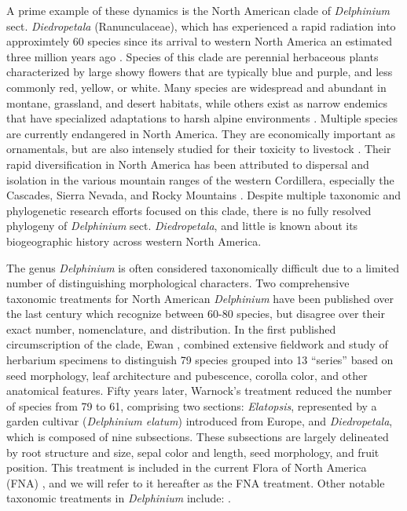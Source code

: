 \documentclass[11pt]{article}
\begin{document}
A prime example of these dynamics is the North American clade of \emph{Delphinium} 
sect. \emph{Diedropetala} (Ranunculaceae), which has experienced a rapid radiation 
into approximtely 60 species since its arrival to western North America an 
estimated three million years ago \citep{jabbour_phylogeny_2012}.
% 
Species of this clade are perennial herbaceous plants characterized by large 
showy flowers that are typically blue and purple, and less commonly red, yellow, 
or white. 
% 
Many species are widespread and abundant in montane, grassland, and desert habitats,
while others exist as narrow endemics that have specialized adaptations to harsh 
alpine environments \citep{warnock_taxonomic_1995}. 
% 
Multiple species are currently endangered in North America. 
They are economically important as ornamentals, but are also intensely studied for 
their toxicity to livestock \citep{cook_biogeographical_2009, 
cook_two_2017, gardner_taxonomic_2002, pfister_grazing_2014}.
Their rapid diversification in North America has been attributed to dispersal and 
isolation in the various mountain ranges of the western Cordillera, especially the
Cascades, Sierra Nevada, and Rocky Mountains \citep{warnock_taxonomic_1995}.
% 
Despite multiple taxonomic and phylogenetic research efforts focused on this clade,
there is no fully resolved phylogeny of \emph{Delphinium} sect. \emph{Diedropetala},
and little is known about its biogeographic history across western North America.


The genus \emph{Delphinium} is often considered taxonomically difficult due to a 
limited number of 
distinguishing
morphological characters. Two comprehensive 
taxonomic treatments for North American \emph{Delphinium} have been published over 
the last century which recognize between 60-80 species, but disagree over their
exact number, nomenclature, and distribution. 
% 
In the first published circumscription of the clade, Ewan \citep{ewan_synopsis_1945},
combined extensive 
fieldwork and study of herbarium specimens to distinguish 79 species grouped 
into 13 “series” based on seed morphology, leaf architecture and pubescence, 
corolla color, and other anatomical features. 
% 
Fifty years later, Warnock’s treatment \citep{warnock_taxonomic_1995}
reduced the number of species 
from 79 to 61, comprising two sections: \emph{Elatopsis}, represented by a garden 
cultivar (\emph{Delphinium elatum}) introduced from Europe, and 
\emph{Diedropetala}, which is composed of nine subsections.
%
These subsections are largely delineated by root structure and size, 
sepal color and length, seed morphology, and fruit position.
% 
This treatment is included in the current Flora of North America (FNA)
\citep{committee_flora_1997}, and we will refer to it hereafter as 
the FNA treatment.
Other notable taxonomic treatments in \emph{Delphinium} include:
\cite{rydberg_delphinium_1899, ewan_genus_1942, wilde1931studies, cronquist_intermountain_1984, ackerfield_flora_2022, chambers_comments_2018, lewis_taxonomic_1954,
koontz_delphinium_2012}.
\end{document}
